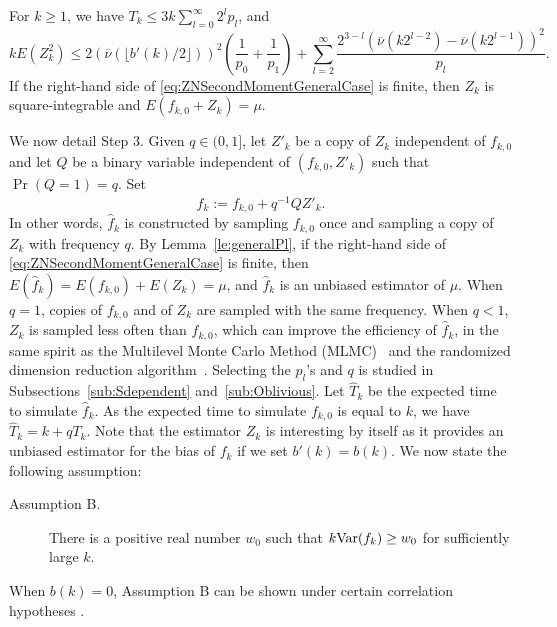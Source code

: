 \documentclass[a4paper,11pt]{article}
\begin{document}
\begin{lemma}\label{le:generalPl} For \(k\ge1\), we have \(T_{k}\le3k\sum^{\infty}_{l=0}2^{l}p_{l}\), and
\begin{equation}
\label{eq:ZNSecondMomentGeneralCase}
kE(Z_{k}^{2})\le2(\overline{\nu}(\lfloor{b'(k)}/{2}\rfloor))^{2}(\frac{1}{p_{0}}+\frac{1}{p_{1}})+\sum^{\infty}_{l=2}\frac{2^{3-l}(\overline{\nu}(k2^{l-2})-\overline{\nu}(k2^{l-1}))^{2}}{p_{l}}.
\end{equation}
If the right-hand side of \eqref{eq:ZNSecondMomentGeneralCase} is finite, then \(Z_{k}\) is square-integrable and  \(E(f_{k,0}+Z_{k})=\mu\).      
\end{lemma}
We now detail Step 3. Given \(q\in(0,1]\), let \(Z'_{k}\) be a copy of \(Z_{k}\) independent of \(f_{k,0}\) and let \(Q\)  be a binary variable independent of \((f_{k,0},Z'_{k})\) such that \(\Pr(Q=1)=q\).  Set
\begin{equation}\label{eq:defHatfk}
\hat f_{k}:=f_{k,0}+q^{-1}QZ'_{k}.
\end{equation} In other words, \(\hat f_{k}\) is constructed by sampling \(f_{k,0}\) once and sampling a copy of \(Z_{k}\) with frequency \(q\).  By Lemma~\ref{le:generalPl}, if the right-hand side of \eqref{eq:ZNSecondMomentGeneralCase} is finite, then  \(E(\hat f_{k})=E(f_{k,0})+E(Z_{k})=\mu\), and \(\hat f_{k}\) is an unbiased estimator of \(\mu\). When \(q=1\), copies of  \(f_{k,0}\) and  of \(Z_{k}\) are sampled with the same frequency.  When \(q<1\),  \(Z_{k}\) is sampled less often than \(f_{k,0}\), which can improve the efficiency of \(\hat f_{k}\),   in the same spirit as the Multilevel Monte Carlo Method (MLMC)~\cite{Giles2008} and the randomized dimension reduction algorithm~\cite{kahaRandomizedDimensionReduction20}.   Selecting the \(p_{l}\)'s and \(q\) is studied in Subsections~\ref{sub:Sdependent} and~\ref{sub:Oblivious}. Let  \(\hat T_{k}\) be the expected time to simulate \(\hat f_{k}\). As the expected time to simulate \(f_{k,0}\) is equal to \(k\), we have \(\hat T_{k}=k+qT_{k}\). Note that the estimator \(Z_{k}\) is interesting by itself as it provides an unbiased estimator for the bias of \(f_{k}\) if we set \(b'(k)=b(k)\). We now state the following assumption:
\begin{description}
\item[Assumption B.] There is a positive real number \(w_{0}\) such that  \(k{\rm Var}(f_{k})\ge w_{0}\) for sufficiently large \(k\).  \end{description}
When \(b(k)=0\), Assumption B can be shown under certain correlation hypotheses  \cite[p. 99]{asmussenGlynn2007}.
\end{document}
